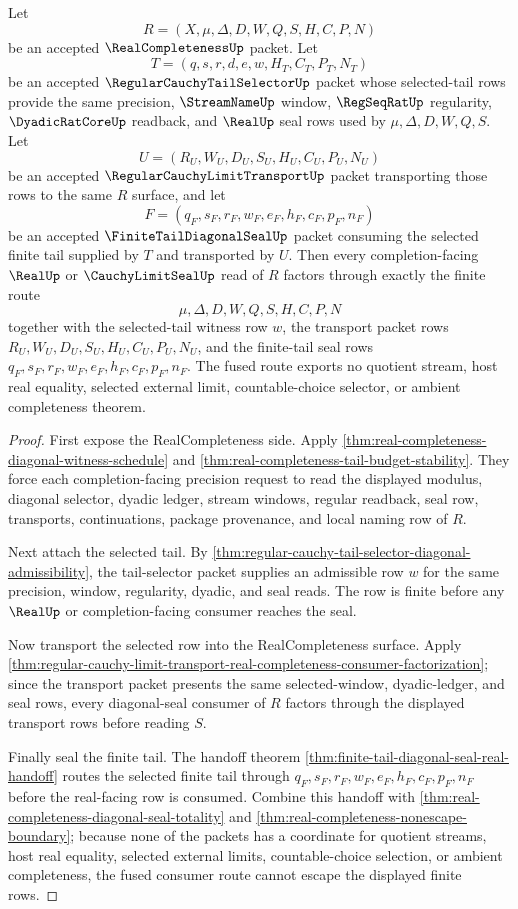 \begin{theorem}
\label{thm:real-completeness-transport-tail-selector-fusion}
Let
$$
R=(X,\mu,\Delta,D,W,Q,S,H,C,P,N)
$$
be an accepted $\RealCompletenessUp$ packet. Let
$$
T=(q,s,r,d,e,w,H_T,C_T,P_T,N_T)
$$
be an accepted $\RegularCauchyTailSelectorUp$ packet whose selected-tail rows provide the same precision, $\StreamNameUp$ window, $\RegSeqRatUp$ regularity, $\DyadicRatCoreUp$ readback, and $\RealUp$ seal rows used by $\mu,\Delta,D,W,Q,S$. Let
$$
U=(R_U,W_U,D_U,S_U,H_U,C_U,P_U,N_U)
$$
be an accepted $\RegularCauchyLimitTransportUp$ packet transporting those rows to the same $R$ surface, and let
$$
F=(q_F,s_F,r_F,w_F,e_F,h_F,c_F,p_F,n_F)
$$
be an accepted $\FiniteTailDiagonalSealUp$ packet consuming the selected finite tail supplied by $T$ and transported by $U$. Then every completion-facing $\RealUp$ or $\CauchyLimitSealUp$ read of $R$ factors through exactly the finite route
$$
\mu,\Delta,D,W,Q,S,H,C,P,N
$$
together with the selected-tail witness row $w$, the transport packet rows $R_U,W_U,D_U,S_U,H_U,C_U,P_U,N_U$, and the finite-tail seal rows $q_F,s_F,r_F,w_F,e_F,h_F,c_F,p_F,n_F$. The fused route exports no quotient stream, host real equality, selected external limit, countable-choice selector, or ambient completeness theorem.
\end{theorem}
\begin{proof}
First expose the RealCompleteness side. Apply \autoref{thm:real-completeness-diagonal-witness-schedule} and \autoref{thm:real-completeness-tail-budget-stability}. They force each completion-facing precision request to read the displayed modulus, diagonal selector, dyadic ledger, stream windows, regular readback, seal row, transports, continuations, package provenance, and local naming row of $R$.

Next attach the selected tail. By \autoref{thm:regular-cauchy-tail-selector-diagonal-admissibility}, the tail-selector packet supplies an admissible row $w$ for the same precision, window, regularity, dyadic, and seal reads. The row is finite before any $\RealUp$ or completion-facing consumer reaches the seal.

Now transport the selected row into the RealCompleteness surface. Apply \autoref{thm:regular-cauchy-limit-transport-real-completeness-consumer-factorization}; since the transport packet presents the same selected-window, dyadic-ledger, and seal rows, every diagonal-seal consumer of $R$ factors through the displayed transport rows before reading $S$.

Finally seal the finite tail. The handoff theorem \autoref{thm:finite-tail-diagonal-seal-real-handoff} routes the selected finite tail through $q_F,s_F,r_F,w_F,e_F,h_F,c_F,p_F,n_F$ before the real-facing row is consumed. Combine this handoff with \autoref{thm:real-completeness-diagonal-seal-totality} and \autoref{thm:real-completeness-nonescape-boundary}; because none of the packets has a coordinate for quotient streams, host real equality, selected external limits, countable-choice selection, or ambient completeness, the fused consumer route cannot escape the displayed finite rows.
\end{proof}


